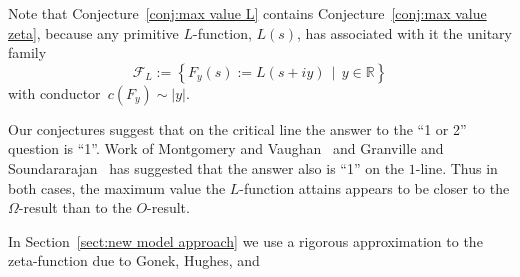 \documentclass[10pt,reqno,twoside]{amsart}
\numberwithin{equation}{section}
\numberwithin{theorem}{section}
\begin{document}
Note that Conjecture~\ref{conj:max value L} contains
Conjecture~\ref{conj:max value zeta}, because any primitive
$L$-function, $L(s)$, has associated with it the unitary family
\begin{equation}
\mathcal F_L := \left\{ F_y(s):=L(s+i y) \ \ |\  \ y\in\mathbb R \right\}
\end{equation}
with conductor~$c(F_y)\sim |y|$.

Our conjectures suggest that on the critical line the answer to
the ``1 or 2'' question is ``1''.  Work of
Montgomery and Vaughan~\cite{MV}
and Granville and Soundararajan~\cite{GS1, GS2} has suggested that
the answer also is ``1'' on the $1$-line.
Thus in both cases, the maximum
value the $L$-function attains appears to be closer to the
$\Omega$-result than to the
$O$-result.

In Section~\ref{sect:new model approach} we use a rigorous
approximation to the zeta-function due to Gonek, Hughes, and
\end{document}
